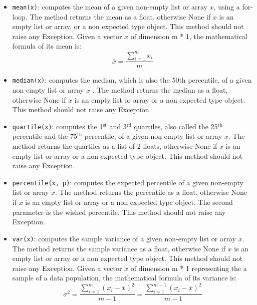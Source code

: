\documentclass{42-en}
\begin{document}
\begin{itemize}
  \item \texttt{mean(x)}: computes the mean of a given non-empty list or array $x$, using a for-loop.
        The method returns the mean as a float, otherwise None if $x$ is an empty list or array,
        or a non expected type object.
        This method should not raise any Exception.
        \newline
        Given a vector $x$ of dimension m * 1, the mathematical formula of its mean is:
        $$
        \bar{x} = \frac{\sum_{i = 1}^{m}{x_i}}{m}
        $$

  \item \texttt{median(x)}: computes the median, which is also the 50th percentile, of a given non-empty list or array $x$ .
        The method returns the median as a float,
        otherwise None if $x$ is an empty list or array or a non expected type object.
        This method should not raise any Exception.

  \item \texttt{quartile(x)}: computes the 1$^\text{st}$ and 3$^\text{rd}$ quartiles,
        also called the 25$^\text{th}$ percentile and the 75$^\text{th}$ percentile, of a given non-empty list or array $x$.
        The method returns the quartiles as a list of 2 floats,
        otherwise None if $x$ is an empty list or array or a non expected type object.
        This method should not raise any Exception.

  \item \texttt{percentile(x, p)}: computes the expected percentile of a given non-empty list or array $x$.
        The method returns the percentile as a float,
        otherwise None if $x$ is an empty list or array or a non expected type object.
        The second parameter is the wished percentile.
        This method should not raise any Exception.

  \item \texttt{var(x)}: computes the sample variance of a given non-empty list or array $x$.
        The method returns the sample variance as a float,
        otherwise None if $x$ is an empty list or array or a non expected type object.
        This method should not raise any Exception.
        \newline
        Given a vector $x$ of dimension m * 1 representing the a sample of a data population, the mathematical formula of its variance is:
        $$
        \sigma^2 = \frac{\sum_{i = 1}^{m}(x_i - \bar{x})^2}{m - 1} = \frac{\sum_{i = 1}^{m - 1}(x_i - \bar{x})^2}{m - 1}
        $$


\end{itemize}
\end{document}
